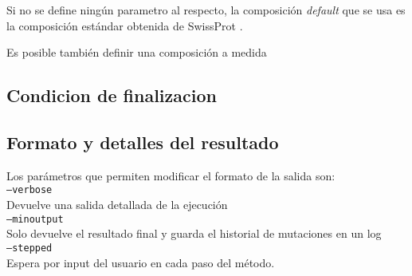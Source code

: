 Si no se define ningún parametro al respecto, la composición \textit{default} que se usa es la composición estándar obtenida de SwissProt \cite{compositionAA}.  

Es posible también definir una composición a medida


\subsection{Condicion de finalizacion} \label{condicionFin}

\subsection{Formato y detalles del resultado}\label{output}
Los parámetros que permiten modificar el formato de la salida son:
\vspace{0.2cm}\\
\texttt{--verbose} \\
\indent \indent Devuelve una salida detallada de la ejecución \\
\texttt{--minoutput} \\
\indent \indent Solo devuelve el resultado final y guarda el historial de mutaciones en un log \\
\texttt{--stepped} \\
\indent \indent Espera por input del usuario en cada paso del método. \\
